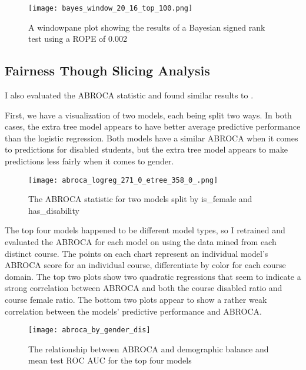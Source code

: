 \documentclass{article}
\begin{document}
        \begin{figure}
            \centering
            \texttt{[image: bayes\_window\_20\_16\_top\_100.png]}
            \caption{A windowpane plot showing the results of a Bayesian signed rank test using a ROPE of 0.002}
            \label{fig:bayes_window_20_16_top_100}
        \end{figure}

    \subsection{Fairness Though Slicing Analysis}
        I also evaluated the ABROCA statistic and found similar results to \cite{eval2019}.

        First, we have a visualization of two models, each being split two ways.
        In both cases, the extra tree model appears to have better average predictive performance than the logistic regression.
        Both models have a similar ABROCA when it comes to predictions for disabled students, but the extra tree model appears to make predictions less fairly when it comes to gender. 

        \begin{figure}
            \centering
            \texttt{[image: abroca\_logreg\_271\_0\_etree\_358\_0\_.png]}
            \caption{The ABROCA statistic for two models split by is\_female and has\_disability}
            \label{fig:abroca_logreg_271_0_etree_358_0_}
        \end{figure}

        The top four models happened to be different model types, so I retrained and evaluated the ABROCA for each model on using the data mined from each distinct course.
        The points on each chart represent an individual model's ABROCA score for an individual course, differentiate by color for each course domain. 
        The top two plots show two quadratic regressions that seem to indicate a strong correlation between ABROCA and both the course disabled ratio and course female ratio.
        The bottom two plots appear to show a rather weak correlation between the models' predictive performance and ABROCA.

        \begin{figure}
            \centering
            \texttt{[image: abroca\_by\_gender\_dis]}
            \caption{The relationship between ABROCA and demographic balance and mean test ROC AUC for the top four models}
            \label{fig:abroca_by_gender_dis}
        \end{figure}
\end{document}
